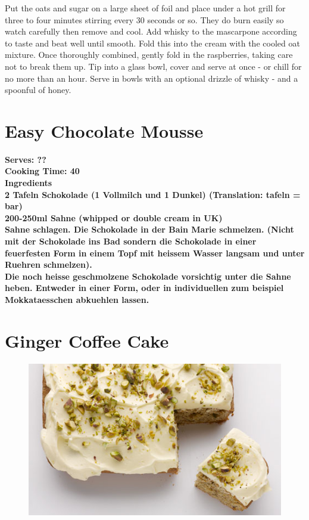 \documentclass[18pt, oneside]{book}
\begin{document}
Put the oats and sugar on a large sheet of foil and place under a hot grill for three to four minutes stirring every 30 seconds or so. They do burn easily so watch carefully then remove and cool. Add whisky to the mascarpone according to taste and beat well until smooth. Fold this into the cream with the cooled oat mixture. Once thoroughly combined, gently fold in the raspberries, taking care not to break them up. Tip into a glass bowl, cover and serve at once - or chill for no more than an hour. Serve in bowls with an optional drizzle of whisky - and a spoonful of honey. 

\section{Easy Chocolate Mousse}
\bf{Serves: ??} \\
\bf{Cooking Time: 40} \\

\bf{Ingredients} \normalfont \\ 
2 Tafeln Schokolade (1 Vollmilch und 1 Dunkel) 
(Translation: tafeln = bar) \\
200-250ml Sahne (whipped or double cream in UK) \\

Sahne schlagen. 
Die Schokolade in der Bain Marie schmelzen. (Nicht mit der Schokolade ins Bad sondern die Schokolade in einer feuerfesten Form in einem Topf mit heissem Wasser  langsam und unter Ruehren schmelzen). \\

Die noch heisse geschmolzene Schokolade vorsichtig unter die Sahne heben. Entweder in einer Form, oder in individuellen zum beispiel Mokkataesschen abkuehlen lassen. \\

\section{Ginger Coffee Cake}

\begin{figure}[h!]
  \begin{center}
  \includegraphics{coffeecake}
  \end{center}
\end{figure}
\end{document}
